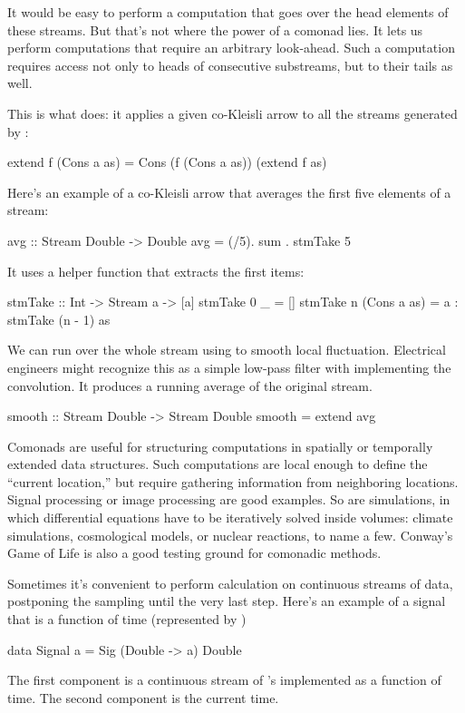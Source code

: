 \documentclass[DaoFP]{subfiles}
\begin{document}
It would be easy to perform a computation that goes over the head elements of these streams. But that's not where the power of a comonad lies. It lets us perform computations that require an arbitrary look-ahead.  Such a computation requires access not only to heads of consecutive substreams, but to their tails as well.

This is what  does: it applies a given co-Kleisli arrow  to all the streams generated by :
\begin{haskell}
  extend f (Cons a as) = Cons (f (Cons a as)) (extend f as)
\end{haskell}

Here's an example of a co-Kleisli arrow that averages the first five elements of a stream:
\begin{haskell}
avg :: Stream Double -> Double
avg  = (/5). sum . stmTake 5
\end{haskell}
It uses a helper function that extracts the first  items:
\begin{haskell}
stmTake :: Int -> Stream a -> [a]
stmTake 0 _ = []
stmTake n (Cons a as) = a : stmTake (n - 1) as
\end{haskell}

We can run  over the whole stream using  to smooth local fluctuation. Electrical engineers might recognize this as a simple low-pass filter with  implementing the convolution. It produces a running average of the original stream. 
\begin{haskell}
smooth :: Stream Double -> Stream Double
smooth = extend avg
\end{haskell}


Comonads are useful for structuring computations in spatially or temporally extended data structures. Such computations are local enough to define the ``current location,'' but require gathering information from neighboring locations. Signal processing or image processing are good examples. So are simulations, in which differential equations have to be iteratively solved inside volumes: climate simulations, cosmological models, or nuclear reactions, to name a few. Conway's Game of Life is also a good testing ground for comonadic methods.

Sometimes it's convenient to perform calculation on continuous streams of data, postponing the sampling until the very last step. Here's an example of a signal that is a function of time (represented by )
\begin{haskell}
data Signal a = Sig (Double -> a) Double
\end{haskell}
The first component is a continuous stream of 's implemented as a function of time. The second component is the current time.
\end{document}
